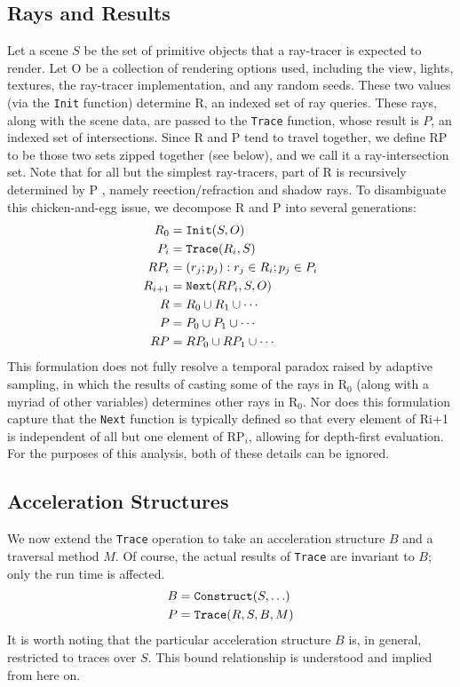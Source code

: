 \documentclass[twocolumn]{article}
\begin{document}
\subsection{Rays and Results}
Let a scene $S$ be the set of primitive objects that a ray-tracer is expected to render. Let O be a collection of rendering options used, including the view, lights, textures, the ray-tracer implementation, and any random seeds. These two values (via the \texttt{Init} function) determine R, an indexed set of ray queries. These rays, along with the scene data, are passed to the \texttt{Trace} function, whose result is $P$, an indexed set of intersections. Since R and P tend to travel together, we define RP to be those two sets zipped together (see below), and we call it a ray-intersection set. Note that for all but the simplest ray-tracers, part of R is recursively determined by P , namely reection/refraction and shadow rays. To disambiguate this chicken-and-egg issue, we decompose R and P into several generations:
\begin{align*} 
R_0 &= {\tt Init}(S, O) \\
P_i &= {\tt Trace}(R_i, S) \\
RP_i &= {(r_j; p_j) : r_j \in R_i; p_j \in P_i} \\
R_{i+1} &= {\tt Next}(RP_i, S, O) \\
R &= R_0 \cup R_1 \cup \cdots \\
P &= P_0 \cup P_1 \cup \cdots \\
RP &= RP_0 \cup RP_1 \cup \cdots 
\end{align*}
This formulation does not fully resolve a temporal paradox raised by adaptive sampling, in which the results of casting some of the rays in R$_0$ (along with a myriad of other variables) determines other rays in R$_0$. Nor does this formulation capture that the \texttt{Next} function is typically defined so that every element of Ri+1 is independent of all but one element of RP$_i$, allowing for depth-first evaluation. For the purposes of this analysis, both of these details can be ignored.

\subsection{Acceleration Structures}
We now extend the \texttt{Trace} operation to take an acceleration structure $B$ and a traversal method $M$. Of course, the actual results of \texttt{Trace} are invariant to $B$; only the run time is affected.
\begin{align*}
B &= {\tt Construct}(S, \ldots) \\
P &= {\tt Trace}(R, S, B, M)
\end{align*}
It is worth noting that the particular acceleration structure $B$ is, in general, restricted to traces over $S$. This bound relationship is understood and implied from here on.
\end{document}
